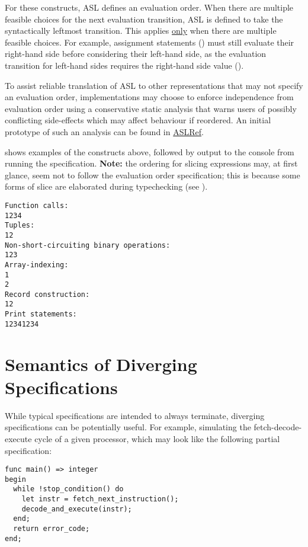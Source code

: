 For these constructs, ASL defines an evaluation order.
When there are multiple feasible choices for the next evaluation transition, ASL is defined to take the syntactically leftmost transition.
This applies \underline{only} when there are multiple feasible choices.
For example, assignment statements () must still evaluate their right-hand side before considering their left-hand side, as the evaluation transition for left-hand sides requires the right-hand side value ().

To assist reliable translation of ASL to other representations that may not specify an evaluation order, implementations may choose to enforce independence from evaluation order using a conservative static analysis that warns users of possibly conflicting side-effects which may affect behaviour if reordered.
An initial prototype of such an analysis can be found in \href{https://github.com/herd/herdtools7/blob/\VERSION/asllib/SideEffect.ml}{ASLRef}.

 shows examples of the constructs above, followed by output to the console from running the specification.
\textbf{Note:} the ordering for slicing expressions may, at first glance, seem not to follow the evaluation order specification; this is because some forms of slice are elaborated during typechecking (see ).
\begin{Verbatim}[fontsize=\footnotesize, frame=single]
Function calls:
1234
Tuples:
12
Non-short-circuiting binary operations:
123
Array-indexing:
1
2
Record construction:
12
Print statements:
12341234
\end{Verbatim}

\section{Semantics of Diverging Specifications\label{sec:Semantics of Diverging Specifications}}
While typical specifications are intended to always terminate,
diverging specifications can be potentially useful.
For example, simulating the fetch-decode-execute cycle of a given processor,
which may look like the following partial specification:
\begin{lstlisting}
func main() => integer
begin
  while !stop_condition() do
    let instr = fetch_next_instruction();
    decode_and_execute(instr);
  end;
  return error_code;
end;
\end{lstlisting}

